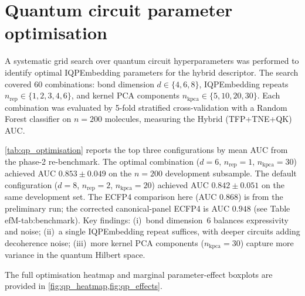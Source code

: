 \documentclass[11pt,a4paper]{article}
\begin{document}

\section{Quantum circuit parameter optimisation}
\label{sec:qp_optimisation}

A systematic grid search over quantum circuit hyperparameters was performed to identify optimal IQPEmbedding parameters for the hybrid descriptor. The search covered \num{60} combinations: bond dimension $d \in \{4, 6, 8\}$, IQPEmbedding repeats $n_{\text{rep}} \in \{1, 2, 3, 4, 6\}$, and kernel PCA components $n_{\text{kpca}} \in \{5, 10, 20, 30\}$. Each combination was evaluated by 5-fold stratified cross-validation with a Random Forest classifier on $n = \num{200}$ molecules, measuring the Hybrid (TFP+TNE+QK) AUC.

\cref{tab:qp_optimisation} reports the top three configurations by mean AUC from the phase-2 re-benchmark. The optimal combination ($d = 6$, $n_{\text{rep}} = 1$, $n_{\text{kpca}} = 30$) achieved AUC $\num{0.853} \pm \num{0.049}$ on the $n=\num{200}$ development subsample. The default configuration ($d = 8$, $n_{\text{rep}} = 2$, $n_{\text{kpca}} = 20$) achieved AUC $\num{0.842} \pm \num{0.051}$ on the same development set. The ECFP4 comparison here (AUC $\num{0.868}$) is from the preliminary run; the corrected canonical-panel ECFP4 is AUC $\num{0.948}$ (see Table~
ef{M-tab:benchmark}). Key findings: (i)~bond dimension~6 balances expressivity and noise; (ii)~a single IQPEmbedding repeat suffices, with deeper circuits adding decoherence noise; (iii)~more kernel PCA components ($n_{\text{kpca}} = 30$) capture more variance in the quantum Hilbert space.

The full optimisation heatmap and marginal parameter-effect boxplots are provided in \cref{fig:qp_heatmap,fig:qp_effects}.
\end{document}
